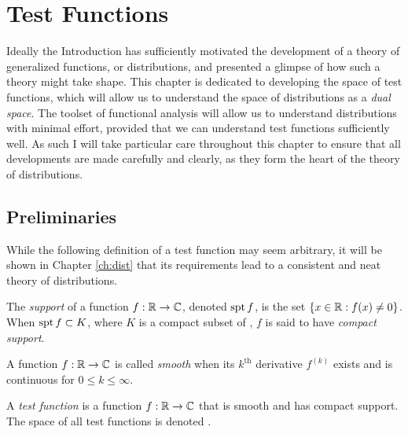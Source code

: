 \documentclass[thesis.tex]{subfiles}
\begin{document}
\onehalfspacing
  \chapter{Test Functions}
  \label{ch:test}

    Ideally the Introduction has sufficiently motivated the development of a theory of generalized functions, or distributions, and presented a glimpse of how such a theory might take shape.
    This chapter is dedicated to developing the space of test functions, which will allow us to understand the space of distributions as a \emph{dual space}.
    The toolset of functional analysis will allow us to understand distributions with minimal effort, provided that we can understand test functions sufficiently well.
    As such I will take particular care throughout this chapter to ensure that all developments are made carefully and clearly, as they form the heart of the theory of distributions.

    \section{Preliminaries}

      While the following definition of a test function may seem arbitrary, it will be shown in Chapter \ref{ch:dist} that its requirements lead to a consistent and neat theory of distributions.
      \begin{defn}
        The \emph{support} of a function $f:\mathbb{R}\rightarrow\mathbb{C}$, denoted $\operatorname{spt} f$, is the set $\{x\in\mathbb{R}: f(x)\ne0\}$.
        When $\operatorname{spt} f \subset K$, where $K$ is a compact subset of \R, $f$ is said to have \emph{compact support}.
      \end{defn}
      \begin{defn}
        A function $f:\mathbb{R}\rightarrow\mathbb{C}$ is called \emph{smooth} when its $k^\text{th}$ derivative $f^{(k)}$ exists and is continuous for $0\le k \le\infty$.
      \end{defn}
      \begin{defn}
        A \emph{test function} is a function $f:\mathbb{R}\rightarrow\mathbb{C}$ that is smooth and has compact support.
        The space of all test functions is denoted \D.
      \end{defn}
\end{document}
